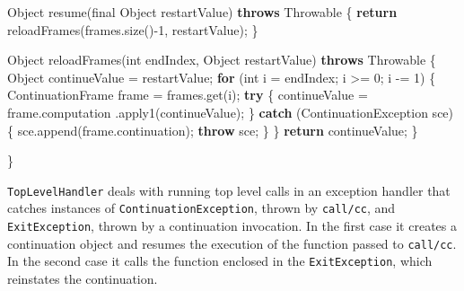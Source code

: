 \documentclass[12pt,a4paper,oneside,openright]{book}
\newenvironment{Shaded}{\begin{snugshade}}{\end{snugshade}}
\newcommand{\KeywordTok}[1]{\textcolor[rgb]{0.13,0.29,0.53}{\textbf{{#1}}}}
\newcommand{\DataTypeTok}[1]{\textcolor[rgb]{0.13,0.29,0.53}{{#1}}}
\newcommand{\DecValTok}[1]{\textcolor[rgb]{0.00,0.00,0.81}{{#1}}}
\newcommand{\FunctionTok}[1]{\textcolor[rgb]{0.00,0.00,0.00}{{#1}}}
\newcommand{\NormalTok}[1]{{#1}}
\begin{document}
\begin{Shaded}
\begin{Highlighting}[]
    \NormalTok{Object }\FunctionTok{resume}\NormalTok{(}\DataTypeTok{final} \NormalTok{Object restartValue) }\KeywordTok{throws} \NormalTok{Throwable \{}
        \KeywordTok{return} \FunctionTok{reloadFrames}\NormalTok{(frames.}\FunctionTok{size}\NormalTok{()-}\DecValTok{1}\NormalTok{, restartValue);}
    \NormalTok{\}}

    \NormalTok{Object }\FunctionTok{reloadFrames}\NormalTok{(}\DataTypeTok{int} \NormalTok{endIndex, Object restartValue)}
    \KeywordTok{throws} \NormalTok{Throwable \{}
        \NormalTok{Object continueValue = restartValue;}
        \KeywordTok{for} \NormalTok{(}\DataTypeTok{int} \NormalTok{i = endIndex; i >= }\DecValTok{0}\NormalTok{; i -= }\DecValTok{1}\NormalTok{) \{}
            \NormalTok{ContinuationFrame frame = frames.}\FunctionTok{get}\NormalTok{(i);}
            \KeywordTok{try} \NormalTok{\{}
                \NormalTok{continueValue = frame.}\FunctionTok{computation}
                                        \NormalTok{.}\FunctionTok{apply1}\NormalTok{(continueValue);}
            \NormalTok{\} }\KeywordTok{catch} \NormalTok{(ContinuationException sce) \{}
                \NormalTok{sce.}\FunctionTok{append}\NormalTok{(frame.}\FunctionTok{continuation}\NormalTok{);}
                \KeywordTok{throw} \NormalTok{sce;}
            \NormalTok{\}}
        \NormalTok{\}}
        \KeywordTok{return} \NormalTok{continueValue;}
    \NormalTok{\}}

\NormalTok{\}}
\end{Highlighting}
\end{Shaded}

\texttt{TopLevelHandler} deals with running top level calls in an
exception handler that catches instances of
\texttt{ContinuationException}, thrown by \texttt{call/cc}, and
\texttt{ExitException}, thrown by a continuation invocation. In the
first case it creates a continuation object and resumes the execution of
the function passed to \texttt{call/cc}. In the second case it calls the
function enclosed in the \texttt{ExitException}, which reinstates the
continuation.
\end{document}
